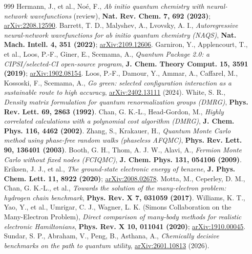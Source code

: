 \documentclass[onecolumn,a4paper]{quantumarticle}
\begin{document}
\begin{thebibliography}{999}
 Hermann, J., et al., Noé, F., \emph{Ab initio quantum chemistry with neural-network wavefunctions} (review), \textbf{Nat. Rev. Chem. 7, 692 (2023)}; \href{https://arxiv.org/abs/2208.12590}{arXiv:2208.12590}.
 Barrett, T. D., Malyshev, A., Lvovsky, A. I., \emph{Autoregressive neural-network wavefunctions for ab initio quantum chemistry (NAQS)}, \textbf{Nat. Mach. Intell. 4, 351 (2022)}; \href{https://arxiv.org/abs/2109.12606}{arXiv:2109.12606}.
 Garniron, Y., Applencourt, T., et al., Loos, P.-F., Giner, E., Scemama, A., \emph{Quantum Package 2.0: a CIPSI/selected-CI open-source program}, \textbf{J. Chem. Theory Comput. 15, 3591 (2019)}; \href{https://arxiv.org/abs/1902.08154}{arXiv:1902.08154}.
 Loos, P.-F., Damour, Y., Ammar, A., Caffarel, M., Kossoski, F., Scemama, A., \emph{Go green: selected configuration interaction as a sustainable route to high accuracy}, \href{https://arxiv.org/abs/2402.13111}{arXiv:2402.13111} (2024).
 White, S. R., \emph{Density matrix formulation for quantum renormalization groups (DMRG)}, \textbf{Phys. Rev. Lett. 69, 2863 (1992)}.
 Chan, G. K.-L., Head-Gordon, M., \emph{Highly correlated calculations with a polynomial cost algorithm (DMRG)}, \textbf{J. Chem. Phys. 116, 4462 (2002)}.
 Zhang, S., Krakauer, H., \emph{Quantum Monte Carlo method using phase-free random walks (phaseless AFQMC)}, \textbf{Phys. Rev. Lett. 90, 136401 (2003)}.
 Booth, G. H., Thom, A. J. W., Alavi, A., \emph{Fermion Monte Carlo without fixed nodes (FCIQMC)}, \textbf{J. Chem. Phys. 131, 054106 (2009)}.
 Eriksen, J. J., et al., \emph{The ground-state electronic energy of benzene}, \textbf{J. Phys. Chem. Lett. 11, 8922 (2020)}; \href{https://arxiv.org/abs/2008.02678}{arXiv:2008.02678}.
 Motta, M., Ceperley, D. M., Chan, G. K.-L., et al., \emph{Towards the solution of the many-electron problem: hydrogen chain benchmark}, \textbf{Phys. Rev. X 7, 031059 (2017)}.
 Williams, K. T., Yao, Y., et al., Umrigar, C. J., Wagner, L. K. (Simons Collaboration on the Many-Electron Problem), \emph{Direct comparison of many-body methods for realistic electronic Hamiltonians}, \textbf{Phys. Rev. X 10, 011041 (2020)}; \href{https://arxiv.org/abs/1910.00045}{arXiv:1910.00045}.
 Sundar, S. P., Abraham, V., Peng, B., Asthana, A., \emph{Chemically decisive benchmarks on the path to quantum utility}, \href{https://arxiv.org/abs/2601.10813}{arXiv:2601.10813} (2026).

\end{thebibliography}
\end{document}

